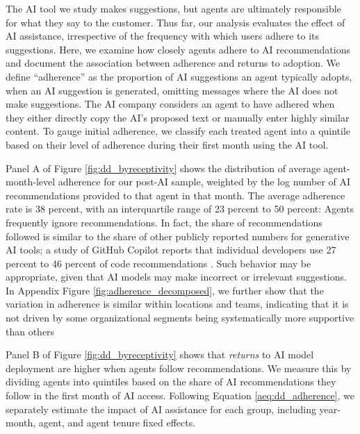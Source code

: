 \documentclass[11pt]{article}
\begin{document}
The AI tool we study makes suggestions, but agents are ultimately responsible for what they say to the customer. Thus far, our analysis evaluates the effect of AI assistance, irrespective of the frequency with which users adhere to its suggestions.
Here, we examine how closely agents adhere to AI recommendations and document the association between adherence and returns to adoption.  
We define ``adherence'' as the proportion of AI suggestions an agent typically adopts, when an AI suggestion is generated, omitting messages where the AI does not make suggestions. The AI company considers an agent to have adhered when they either directly copy the AI's proposed text or manually enter highly similar content. To gauge initial adherence, we classify each treated agent into a quintile based on their level of adherence during their first month using the AI tool. 


Panel A of Figure \ref{fig:dd_byreceptivity} shows the distribution of average agent-month-level adherence for our post-AI sample, weighted by the log number of AI recommendations provided to that agent in that month.  The average adherence rate is 38 percent, with an interquartile range of 23 percent to 50 percent: Agents frequently ignore recommendations.  In fact, the share of recommendations followed is similar to the share of other publicly reported numbers for generative AI tools; a study of GitHub Copilot reports that individual developers use 27 percent to 46 percent of code recommendations \citep{zhao2023}. Such behavior may be appropriate, given that AI models may make incorrect or irrelevant suggestions.  In Appendix Figure \ref{fig:adherence_decomposed}, we further show that the variation in adherence is similar within locations and teams, indicating that it is not driven by some organizational segments being systematically more supportive than others

Panel B of Figure \ref{fig:dd_byreceptivity} shows that \textit{returns} to AI model deployment are higher when agents follow recommendations.  We measure this by dividing agents into quintiles based on the share of AI recommendations they follow in the first month of AI access. Following Equation \ref{aeq:dd_adherence}, we separately estimate the impact of AI assistance for each group, including year-month, agent, and agent tenure fixed effects.
\end{document}
